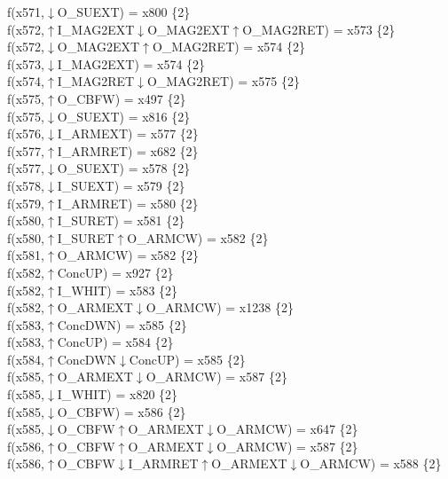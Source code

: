f(x571,$\downarrow$O\_SUEXT) = x800 \{2\} \\  
f(x572,$\uparrow$I\_MAG2EXT$\downarrow$O\_MAG2EXT$\uparrow$O\_MAG2RET) = x573 \{2\} \\  
f(x572,$\downarrow$O\_MAG2EXT$\uparrow$O\_MAG2RET) = x574 \{2\} \\  
f(x573,$\downarrow$I\_MAG2EXT) = x574 \{2\} \\  
f(x574,$\uparrow$I\_MAG2RET$\downarrow$O\_MAG2RET) = x575 \{2\} \\  
f(x575,$\uparrow$O\_CBFW) = x497 \{2\} \\  
f(x575,$\downarrow$O\_SUEXT) = x816 \{2\} \\  
f(x576,$\downarrow$I\_ARMEXT) = x577 \{2\} \\  
f(x577,$\uparrow$I\_ARMRET) = x682 \{2\} \\  
f(x577,$\downarrow$O\_SUEXT) = x578 \{2\} \\  
f(x578,$\downarrow$I\_SUEXT) = x579 \{2\} \\  
f(x579,$\uparrow$I\_ARMRET) = x580 \{2\} \\  
f(x580,$\uparrow$I\_SURET) = x581 \{2\} \\  
f(x580,$\uparrow$I\_SURET$\uparrow$O\_ARMCW) = x582 \{2\} \\  
f(x581,$\uparrow$O\_ARMCW) = x582 \{2\} \\  
f(x582,$\uparrow$ConcUP) = x927 \{2\} \\  
f(x582,$\uparrow$I\_WHIT) = x583 \{2\} \\  
f(x582,$\uparrow$O\_ARMEXT$\downarrow$O\_ARMCW) = x1238 \{2\} \\  
f(x583,$\uparrow$ConcDWN) = x585 \{2\} \\  
f(x583,$\uparrow$ConcUP) = x584 \{2\} \\  
f(x584,$\uparrow$ConcDWN$\downarrow$ConcUP) = x585 \{2\} \\  
f(x585,$\uparrow$O\_ARMEXT$\downarrow$O\_ARMCW) = x587 \{2\} \\  
f(x585,$\downarrow$I\_WHIT) = x820 \{2\} \\  
f(x585,$\downarrow$O\_CBFW) = x586 \{2\} \\  
f(x585,$\downarrow$O\_CBFW$\uparrow$O\_ARMEXT$\downarrow$O\_ARMCW) = x647 \{2\} \\  
f(x586,$\uparrow$O\_CBFW$\uparrow$O\_ARMEXT$\downarrow$O\_ARMCW) = x587 \{2\} \\  
f(x586,$\uparrow$O\_CBFW$\downarrow$I\_ARMRET$\uparrow$O\_ARMEXT$\downarrow$O\_ARMCW) = x588 \{2\} \\  
